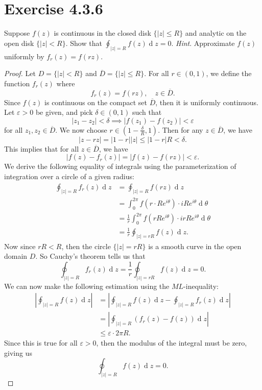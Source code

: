 \documentclass[12pt]{article}
\newenvironment{problem}
    {\begin{lrbox}{\mybox}\begin{minipage}{0.98\textwidth}}
    {\end{minipage}\end{lrbox}\framebox[\textwidth]{\usebox{\mybox}}}
\let\eps\varepsilon %
\newcommand{\<}{\left\langle} %
\renewcommand{\>}{\right\rangle} %
\renewcommand{\d}[1]{\operatorname{d}\!#1} %
\let\clo\overline %
\begin{document}
\newpage
\section{Exercise 4.3.6}
\begin{problem}
    Suppose $f(z)$ is continuous in the closed disk $\{|z| \leq R\}$ and analytic on the open disk $\{|z| < R\}$. Show that $\oint_{|z| = R} f(z) \d{z} = 0$. \emph{Hint}. Approximate $f(z)$ uniformly by $f_r(z) = f(rz)$. 
\end{problem}

\begin{proof}
    Let $D = \{|z| < R\}$ and $\clo{D} = \{|z| \leq R\}$. For all $r \in (0, 1)$, we define the function $f_r(z)$ where
    \[f_r(z) = f(rz), \quad z \in \clo{D}.\]
    Since $f(z)$ is continuous on the compact set $\clo{D}$, then it is uniformly continuous. Let $\eps > 0$ be given, and pick $\delta \in (0, 1)$ such that
    \[|z_1 - z_2| < \delta \implies |f(z_1) - f(z_2)| < \eps\]
    for all $z_1, z_2 \in \clo{D}$. We now choose $r \in \left( 1 - \frac{\delta}{R}, 1 \right)$. Then for any $z \in \clo{D}$, we have
    \[|z - rz| = |1 - r||z| \leq |1 - r|R < \delta.\]
    This implies that for all $z \in \clo{D}$, we have
    \[|f(z) - f_r(z)| = |f(z) - f(rz)| < \eps.\]
    We derive the following equality of integrals using the parameterization of integration over a circle of a given radius:
    \begin{align*}
        \oint_{|z| = R} f_r(z) \d{z}
            &= \oint_{|z| = R} f(rz) \d{z} \\
            &= \int_0^{2\pi} f(r \cdot Re^{i\theta}) \cdot i R e^{i\theta} \d{\theta} \\
            &= \frac{1}{r} \int_0^{2\pi} f(rRe^{i\theta}) \cdot i rR e^{i\theta} \d{\theta} \\
            &= \frac{1}{r} \oint_{|z| = rR} f(z) \d{z}.
    \end{align*}
    Now since $rR < R$, then the circle $\{|z| = rR\}$ is a smooth curve in the open domain $D$. So Cauchy's theorem tells us that
    \[\oint_{|z| = R} f_r(z) \d{z} = \frac{1}{r}\oint_{|z| = rR} f(z) \d{z} = 0.\]
    We can now make the following estimation using the $ML$-inequality:
    \begin{align*}
        \left| \oint_{|z| = R} f(z) \d{z} \right|
            &= \left| \oint_{|z| = R} f(z) \d{z} - \oint_{|z| = R} f_r(z) \d{z} \right| \\[1em]
            &= \left| \oint_{|z| = R} (f_r(z) - f(z)) \d{z} \right| \\[1em]
            &\leq \eps \cdot 2\pi R.
    \end{align*}
    Since this is true for all $\eps > 0$, then the modulus of the integral must be zero, giving us
    \[\oint_{|z| = R} f(z) \d{z} = 0.\]
    
\end{proof}
\end{document}
